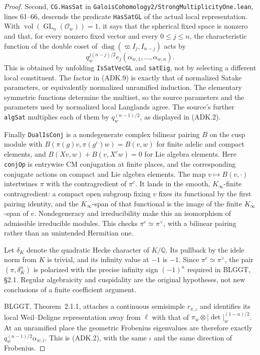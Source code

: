 \begin{proof}
Second, \texttt{CG.HasSat} in
\texttt{GaloisCohomology2/StrongMultiplicityOne.lean},
lines 61--66, descends the predicate
\texttt{HasSatGL} of the actual local representation.  With
$\operatorname{vol}(\operatorname{GL}_n(\mathcal O_w))=1$, it
says that the spherical fixed space is nonzero and that, for every
nonzero fixed vector and every $0\le j\le n$, the characteristic
function of the double coset of
$\operatorname{diag}(\varpi I_j,I_{n-j})$ acts by
\[
             q_w^{j(n-j)/2} e_j(\alpha_{w,1},\ldots,
                                    \alpha_{w,n}).
 \tag{ADK.9}
\]
This is obtained by unfolding \texttt{IsSatVecGL} and
\texttt{satEig}, not by selecting a different local constituent.
The factor in (ADK.9) is exactly that of normalized Satake
parameters, or equivalently normalized unramified induction.
The elementary symmetric functions determine the multiset, so the
source parameters and the parameters used by normalized local
Langlands agree.  The source's further \texttt{algSat} multiplies
each of them by $q_w^{(n-1)/2}$, as displayed in (ADK.2).

Finally \texttt{DualIsConj} is a nondegenerate complex bilinear
pairing $B$ on the cusp module with
$B(\pi(g)v,\pi(g^c)w)=B(v,w)$ for finite adelic and compact
elements, and
$B(Xv,w)+B(v,X^cw)=0$ for Lie algebra elements.
Here \texttt{conjOp} is entrywise CM conjugation at finite places,
and the corresponding conjugate actions on compact and Lie algebra
elements.  The map $v\mapsto B(v,\cdot)$ intertwines $\pi$ with
the contragredient of $\pi^c$.  It lands in the smooth,
$K_\infty$-finite contragredient: a compact open subgroup fixing
$v$ fixes its functional by the first pairing identity, and the
$K_\infty$-span of that functional is the image of the finite
$K_\infty$-span of $v$.  Nondegeneracy and irreducibility make this
an isomorphism of admissible irreducible modules.  This checks
$\pi^c\simeq\pi^\vee$, with a bilinear pairing rather than an
unintended Hermitian one.

Let $\delta_K$ denote the quadratic Hecke character of
$K/\mathbb Q$.  Its pullback by the idele norm from $K$ is trivial,
and its infinity value at $-1$ is $-1$.  Since
$\pi^c\simeq\pi^\vee$, the pair
$(\pi,\delta_K^n)$ is polarized with the precise infinity sign
$(-1)^n$ required in BLGGT, \S2.1.  Regular algebraicity and
cuspidality are the original hypotheses, not new conclusions of a
finite coefficient argument.

BLGGT, Theorem~2.1.1, attaches a continuous semisimple
$r_{\pi,\iota}$ and identifies its local Weil--Deligne representation
away from $\ell$ with that of
$\pi_w\otimes|\det|_w^{(1-n)/2}$.  At an unramified place the
geometric Frobenius eigenvalues are therefore exactly
$q_w^{(n-1)/2}\alpha_{w,i}$.  This is (ADK.2), with the same
$\iota$ and the same direction of Frobenius.


\end{proof}
